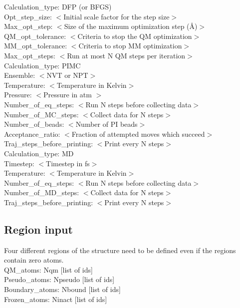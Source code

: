 \documentclass[12pt]{report}
\begin{document}
Calculation\_type: DFP (or BFGS) \\
Opt\_step\_size: $<$Initial scale factor for the step size$>$ \\
Max\_opt\_step: $<$Size of the maximum optimization step (\AA)$>$
QM\_opt\_tolerance: $<$Criteria to stop the QM optimization$>$\\
MM\_opt\_tolerance: $<$Criteria to stop MM optimization$>$ \\
Max\_opt\_steps: $<$Run at most N QM steps per iteration$>$ \\

Calculation\_type: PIMC \\
Ensemble: $<$NVT or NPT$>$ \\
Temperature: $<$Temperature in Kelvin$>$ \\
Pressure: $<$Pressure in atm $>$ \\
Number\_of\_eq\_steps: $<$Run N steps before collecting data$>$ \\
Number\_of\_MC\_steps: $<$Collect data for N steps$>$ \\
Number\_of\_beads: $<$Number of PI beads$>$ \\
Acceptance\_ratio: $<$Fraction of attempted moves which succeed$>$ \\
Traj\_steps\_before\_printing: $<$Print every N steps$>$ \\

Calculation\_type: MD \\
Timestep: $<$Timestep in fs$>$ \\
Temperature: $<$Temperature in Kelvin$>$ \\
Number\_of\_eq\_steps: $<$Run N steps before collecting data$>$ \\
Number\_of\_MD\_steps: $<$Collect data for N steps$>$ \\
Traj\_steps\_before\_printing: $<$Print every N steps$>$ \\

\subsection{Region input}

Four different regions of the structure need to be defined even if the
regions contain zero atoms. \\

QM\_atoms: Nqm [list of ids] \\
Pseudo\_atoms: Npseudo [list of ids] \\
Boundary\_atoms: Nbound [list of ids] \\
Frozen\_atoms: Ninact [list of ids] \\
\end{document}
